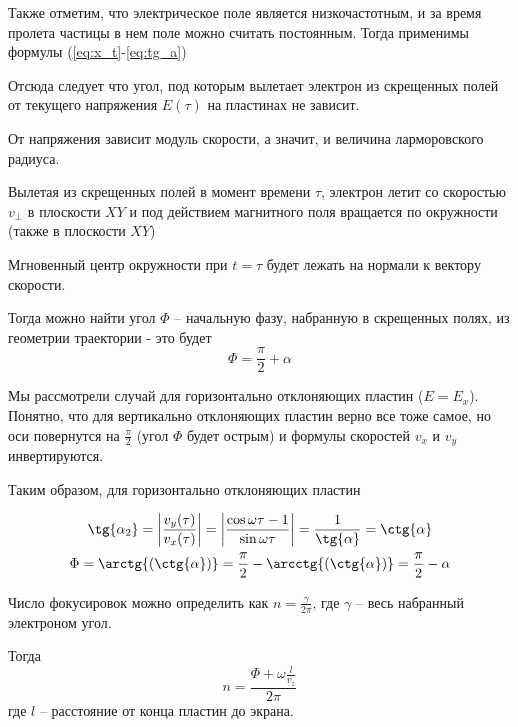 Также отметим, что электрическое поле является низкочастотным, и за время пролета частицы в нем поле можно считать постоянным. Тогда применимы формулы (\ref{eq:x_t}-\ref{eq:tg_a}) 

Отсюда следует что угол, под которым вылетает электрон из скрещенных полей от текущего напряжения $E(\tau)$ на пластинах не зависит. 

От напряжения зависит модуль скорости, а значит, и величина ларморовского радиуса. 

Вылетая из скрещенных полей в момент времени $\tau$, электрон летит со скоростью $v_\perp$ в плоскости $XY$ и под действием магнитного поля вращается по окружности (также в плоскости $XY$)

Мгновенный центр окружности при $t=\tau$ будет лежать на нормали к вектору скорости.

Тогда можно найти угол $\Phi$ -- начальную фазу, набранную в скрещенных полях, из геометрии траектории - это будет $$\Phi=\frac{\pi}{2}+\alpha$$

Мы рассмотрели случай для горизонтально отклоняющих пластин ($E=E_x$). Понятно, что для вертикально отклоняющих пластин верно все тоже самое, но оси повернутся на $\frac{\pi}{2}$ (угол $\Phi$ будет острым) и формулы скоростей $v_x$ и $v_y$ инвертируются. 

Таким образом, для горизонтально отклоняющих пластин 

\begin{gather}
	\tg{\alpha_2}=\left|\frac{v_y(\tau)}{v_x(\tau)}\right|=\left|\frac{\cos\omega{\tau}-1}{\sin{\omega{\tau}}}\right|=\frac{1}{\tg{\alpha}}=\ctg{\alpha}\\
	\Phi=\arctg{(\ctg{\alpha})}=\frac{\pi}{2}-\arcctg{(\ctg{\alpha})}=\frac{\pi}{2}-\alpha
\end{gather}

Число фокусировок можно определить как $n=\frac{\gamma}{2\pi}$, где $\gamma$ -- весь набранный электроном угол.

Тогда
\begin{equation}
	n=\frac{\Phi+\omega\frac{l}{v_z}}{2\pi}
\end{equation}
где $l$ -- расстояние от конца пластин до экрана.


